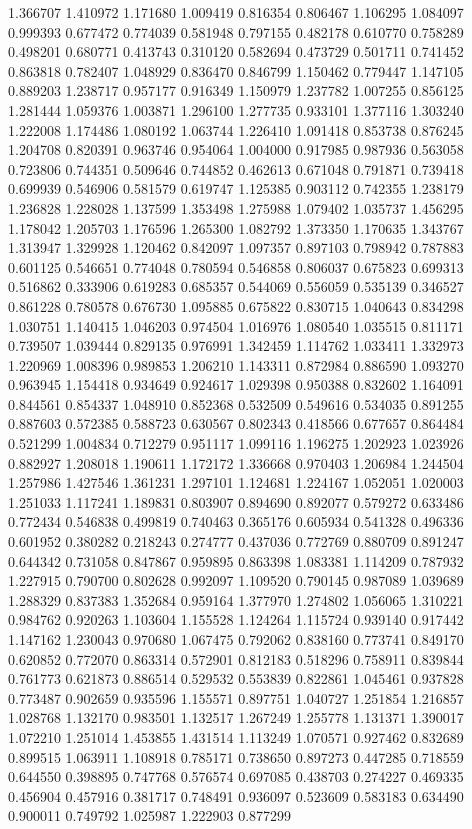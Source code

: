 1.366707
1.410972
1.171680
1.009419
0.816354
0.806467
1.106295
1.084097
0.999393
0.677472
0.774039
0.581948
0.797155
0.482178
0.610770
0.758289
0.498201
0.680771
0.413743
0.310120
0.582694
0.473729
0.501711
0.741452
0.863818
0.782407
1.048929
0.836470
0.846799
1.150462
0.779447
1.147105
0.889203
1.238717
0.957177
0.916349
1.150979
1.237782
1.007255
0.856125
1.281444
1.059376
1.003871
1.296100
1.277735
0.933101
1.377116
1.303240
1.222008
1.174486
1.080192
1.063744
1.226410
1.091418
0.853738
0.876245
1.204708
0.820391
0.963746
0.954064
1.004000
0.917985
0.987936
0.563058
0.723806
0.744351
0.509646
0.744852
0.462613
0.671048
0.791871
0.739418
0.699939
0.546906
0.581579
0.619747
1.125385
0.903112
0.742355
1.238179
1.236828
1.228028
1.137599
1.353498
1.275988
1.079402
1.035737
1.456295
1.178042
1.205703
1.176596
1.265300
1.082792
1.373350
1.170635
1.343767
1.313947
1.329928
1.120462
0.842097
1.097357
0.897103
0.798942
0.787883
0.601125
0.546651
0.774048
0.780594
0.546858
0.806037
0.675823
0.699313
0.516862
0.333906
0.619283
0.685357
0.544069
0.556059
0.535139
0.346527
0.861228
0.780578
0.676730
1.095885
0.675822
0.830715
1.040643
0.834298
1.030751
1.140415
1.046203
0.974504
1.016976
1.080540
1.035515
0.811171
0.739507
1.039444
0.829135
0.976991
1.342459
1.114762
1.033411
1.332973
1.220969
1.008396
0.989853
1.206210
1.143311
0.872984
0.886590
1.093270
0.963945
1.154418
0.934649
0.924617
1.029398
0.950388
0.832602
1.164091
0.844561
0.854337
1.048910
0.852368
0.532509
0.549616
0.534035
0.891255
0.887603
0.572385
0.588723
0.630567
0.802343
0.418566
0.677657
0.864484
0.521299
1.004834
0.712279
0.951117
1.099116
1.196275
1.202923
1.023926
0.882927
1.208018
1.190611
1.172172
1.336668
0.970403
1.206984
1.244504
1.257986
1.427546
1.361231
1.297101
1.124681
1.224167
1.052051
1.020003
1.251033
1.117241
1.189831
0.803907
0.894690
0.892077
0.579272
0.633486
0.772434
0.546838
0.499819
0.740463
0.365176
0.605934
0.541328
0.496336
0.601952
0.380282
0.218243
0.274777
0.437036
0.772769
0.880709
0.891247
0.644342
0.731058
0.847867
0.959895
0.863398
1.083381
1.114209
0.787932
1.227915
0.790700
0.802628
0.992097
1.109520
0.790145
0.987089
1.039689
1.288329
0.837383
1.352684
0.959164
1.377970
1.274802
1.056065
1.310221
0.984762
0.920263
1.103604
1.155528
1.124264
1.115724
0.939140
0.917442
1.147162
1.230043
0.970680
1.067475
0.792062
0.838160
0.773741
0.849170
0.620852
0.772070
0.863314
0.572901
0.812183
0.518296
0.758911
0.839844
0.761773
0.621873
0.886514
0.529532
0.553839
0.822861
1.045461
0.937828
0.773487
0.902659
0.935596
1.155571
0.897751
1.040727
1.251854
1.216857
1.028768
1.132170
0.983501
1.132517
1.267249
1.255778
1.131371
1.390017
1.072210
1.251014
1.453855
1.431514
1.113249
1.070571
0.927462
0.832689
0.899515
1.063911
1.108918
0.785171
0.738650
0.897273
0.447285
0.718559
0.644550
0.398895
0.747768
0.576574
0.697085
0.438703
0.274227
0.469335
0.456904
0.457916
0.381717
0.748491
0.936097
0.523609
0.583183
0.634490
0.900011
0.749792
1.025987
1.222903
0.877299

